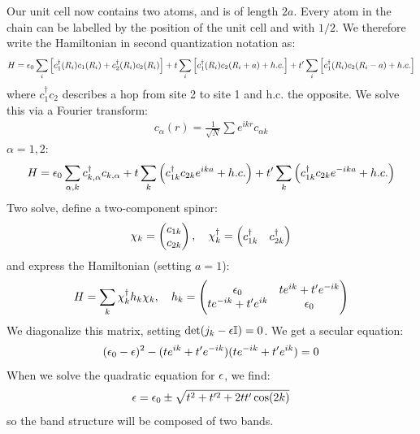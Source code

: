Our unit cell now contains two atoms, and is of length $2a$. Every atom in the chain can be labelled by the position of the unit cell and with $1/2$. We therefore write the Hamiltonian in second quantization notation as:
\begin{equation}
    H = \epsilon_0 \sum_i \left[c_1^\dagger(R_i)c_1(R_i) + c_2^\dagger(R_i)c_2(R_i)\right] + t\sum_i\left[c_1^\dagger(R_i)c_2(R_i + a) + h.c.\right] + t'\sum_i \left[c_1^\dagger(R_i)c_2(R_i - a) + h.c.\right]
\end{equation}
where $c_1^\dag c_2$ describes a hop from site 2 to site 1 and h.c. the opposite. We solve this via a Fourier transform:
\begin{align*}
    c_\alpha(r) = \frac{1}{\sqrt{N}}\sum e^{ikr}c_{\alpha k}
\end{align*}
$\alpha = 1, 2$:
\begin{equation}
    H = \epsilon_0\sum_{\alpha, k}c^\dagger_{k, \alpha}c_{k, \alpha} + t\sum_k \left(c^\dagger_{1k}c_{2k}e^{ika} + h.c.\right) + t'\sum_k \left(c^\dagger_{1k}c_{2k}e^{-ika} + h.c.\right)
\end{equation}
Two solve, define a two-component spinor:
\begin{align*}
    \chi_k = \begin{pmatrix}c_{1k} \\ c_{2k}\end{pmatrix}, \quad \chi_k^\dagger = \begin{pmatrix}c^\dagger_{1k} & c^\dagger_{2k}\end{pmatrix}
\end{align*}
and express the Hamiltonian (setting $a = 1$):
\begin{equation}
    H = \sum_k \chi_k^\dagger h_k\chi_k, \quad  h_k = \begin{pmatrix}\epsilon_0 & te^{ik} + t'e^{-ik} \\ te^{-ik} + t'e^{ik} & \epsilon_0\end{pmatrix}
\end{equation}
We diagonalize this matrix, setting $\det(j_k - \epsilon\mathbb{I}) = 0$. We get a secular equation:
\begin{align*}
    (\epsilon_0 - \epsilon)^2 - (te^{ik} + t'e^{-ik})(te^{-ik} + t'e^{ik}) = 0
\end{align*}
When we solve the quadratic equation for $\epsilon$, we find:
\begin{equation}
    \epsilon = \epsilon_0 \pm \sqrt{t^2 + t'^2 + 2tt'\cos(2k)}
\end{equation}
so the band structure will be composed of two bands.


